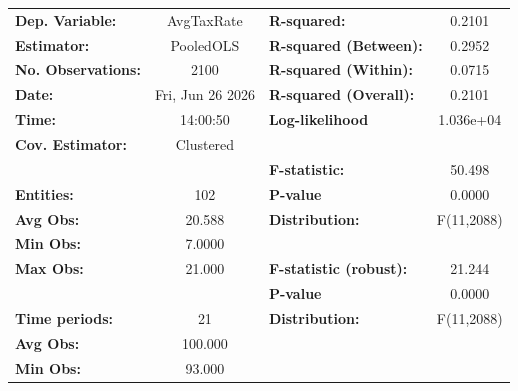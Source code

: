 \begin{center}
\begin{tabular}{lclc}
\toprule
\textbf{Dep. Variable:}                            &     AvgTaxRate     & \textbf{  R-squared:         }   &      0.2101      \\
\textbf{Estimator:}                                &     PooledOLS      & \textbf{  R-squared (Between):}  &      0.2952      \\
\textbf{No. Observations:}                         &        2100        & \textbf{  R-squared (Within):}   &      0.0715      \\
\textbf{Date:}                                     &  Fri, Jun 26 2026  & \textbf{  R-squared (Overall):}  &      0.2101      \\
\textbf{Time:}                                     &      14:00:50      & \textbf{  Log-likelihood     }   &    1.036e+04     \\
\textbf{Cov. Estimator:}                           &     Clustered      & \textbf{                     }   &                  \\
\textbf{}                                          &                    & \textbf{  F-statistic:       }   &      50.498      \\
\textbf{Entities:}                                 &        102         & \textbf{  P-value            }   &      0.0000      \\
\textbf{Avg Obs:}                                  &       20.588       & \textbf{  Distribution:      }   &    F(11,2088)    \\
\textbf{Min Obs:}                                  &       7.0000       & \textbf{                     }   &                  \\
\textbf{Max Obs:}                                  &       21.000       & \textbf{  F-statistic (robust):} &      21.244      \\
\textbf{}                                          &                    & \textbf{  P-value            }   &      0.0000      \\
\textbf{Time periods:}                             &         21         & \textbf{  Distribution:      }   &    F(11,2088)    \\
\textbf{Avg Obs:}                                  &      100.000       & \textbf{                     }   &                  \\
\textbf{Min Obs:}                                  &       93.000       & \textbf{                     }   &                  \\

\end{tabular}
\end{center}
